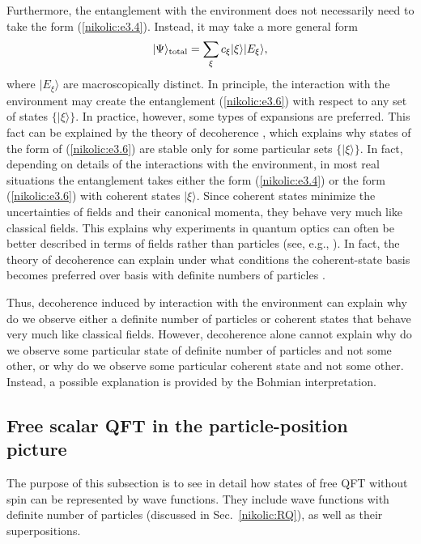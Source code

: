 \documentclass[12pt,twoside]{report} %
\begin{document}
Furthermore, the entanglement with the environment does not
necessarily need to take the form (\ref{nikolic:e3.4}). Instead, it may take a
more general form
\begin{equation}\label{nikolic:e3.6}
 |\Psi\rangle_{\rm total}  = \sum_{\xi} c_{\xi} |\xi\rangle |E_\xi\rangle , 
\end{equation}
where $|E_\xi\rangle$ are macroscopically distinct. 
In principle, the interaction with the environment may create the entanglement
(\ref{nikolic:e3.6}) with respect to any set of states $\{ |\xi\rangle \}$.
In practice, however, some types of expansions are preferred.
This fact can be explained by the theory of decoherence \cite{schloss}, which 
explains why states of the form of (\ref{nikolic:e3.6}) are stable only for some particular
sets $\{ |\xi\rangle \}$. In fact, depending on details of the interactions
with the environment, in most real situations the entanglement takes either the form
(\ref{nikolic:e3.4}) or the form (\ref{nikolic:e3.6}) with coherent states $|\xi\rangle$.
Since coherent states minimize the uncertainties of fields and their canonical momenta,
they behave very much like classical fields. This explains why experiments in quantum
optics can often be better described in terms of fields rather than particles 
(see, e.g., \cite{bal}). In fact, the theory of decoherence can explain 
under what conditions the coherent-state basis becomes preferred over
basis with definite numbers of particles \cite{zeh,zurek}. 

Thus, decoherence induced by interaction with the environment
can explain why do we observe either a definite number
of particles or coherent states that behave very much like classical fields.
However, decoherence alone 
cannot explain why do we observe 
some particular state of definite number of particles and not some other, 
or why do we observe some particular coherent state and not some other.
Instead, a possible explanation is provided by the Bohmian interpretation.

\subsection{Free scalar QFT in the particle-position picture}
\label{nikolic:SEC3.2}

The purpose of this subsection is to see in detail
how states of free QFT without spin can be represented
by wave functions. They include wave functions with definite number of
particles (discussed in Sec.~\ref{nikolic:RQ}), as well as their superpositions.
\end{document}
